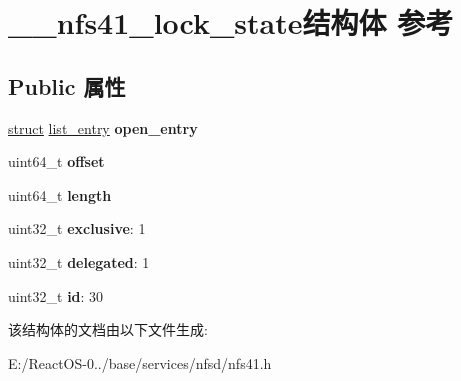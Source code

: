 \hypertarget{struct____nfs41__lock__state}{}\section{\+\_\+\+\_\+nfs41\+\_\+lock\+\_\+state结构体 参考}
\label{struct____nfs41__lock__state}
\subsection*{Public 属性}
\begin{DoxyCompactItemize}
\item 
\mbox{\label{struct____nfs41__lock__state_a690fe550ce8c7eabfafe09317eb9c3cf}} 
\hyperlink{interfacestruct}{struct} \hyperlink{structlist__entry}{list\+\_\+entry} {\bfseries open\+\_\+entry}
\item 
\mbox{\label{struct____nfs41__lock__state_afd00092b7d3d956650f169470bdf2260}} 
uint64\+\_\+t {\bfseries offset}
\item 
\mbox{\label{struct____nfs41__lock__state_ae6c2205249e34a3f819c6842c434e8fb}} 
uint64\+\_\+t {\bfseries length}
\item 
\mbox{\label{struct____nfs41__lock__state_ad249c260649d2a7d42e0eb58ea8869b7}} 
uint32\+\_\+t {\bfseries exclusive}\+: 1
\item 
\mbox{\label{struct____nfs41__lock__state_a576b5fdf81d15fb0a5a5aeaee3eb2e50}} 
uint32\+\_\+t {\bfseries delegated}\+: 1
\item 
\mbox{\label{struct____nfs41__lock__state_a493831f503edfaa2c7858b112b546497}} 
uint32\+\_\+t {\bfseries id}\+: 30
\end{DoxyCompactItemize}


该结构体的文档由以下文件生成\+:\begin{DoxyCompactItemize}
\item 
E\+:/\+React\+O\+S-\/0../base/services/nfsd/nfs41.\+h\end{DoxyCompactItemize}
